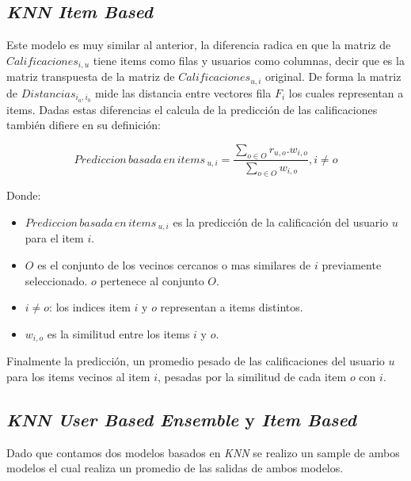 \documentclass[11pt,a4paper,twoside]{thesis}
\begin{document}
\subsection{\textit{KNN Item Based}}

Este modelo es muy similar al anterior, la diferencia radica en que la matriz de $Calificaciones_{i, u}$ tiene items como filas y usuarios como columnas, decir que es la matriz transpuesta de la matriz de $Calificaciones_{u, i}$ original. De forma la matriz de $Distancias_{i_a,i_b}$ mide las distancia entre vectores fila $F_i$ los cuales representan a items. Dadas estas diferencias el calcula de la predicción de las calificaciones también difiere en su definición:


\begin{equation*}
	Prediccion \mspace{3mu}basada \mspace{3mu}en \mspace{3mu}items\mspace{3mu}_{u, i} = \frac{\sum_{o \in O} r_{u, o}. w_{i, o} }{\sum_{o \in O} w_{i, o} }, i \neq o
\end{equation*}
\begin{description}
	\item[Donde:]
\end{description}
\begin{itemize}
	\item $Prediccion \mspace{3mu}basada \mspace{3mu}en \mspace{3mu}items\mspace{3mu}_{u, i}$ es la predicción de la calificación del usuario $u$ para el item $i$.
	\item $O$ es el conjunto de los vecinos cercanos o mas similares de $i$ previamente seleccionado. $o$ pertenece al conjunto $O$.
	\item $i \neq o$: los indices item $i$ y $o$ representan a items distintos. 
	\item $w_{i,o}$ es la similitud entre los items $i$ y $o$.
\end{itemize}

Finalmente la predicción, un promedio pesado de las calificaciones del usuario $u$ para los items vecinos al item $i$, pesadas por la similitud de cada item $o$ con $i$.

\subsection{\textit{KNN User Based Ensemble} y \textit{Item Based}}

Dado que contamos dos modelos basados en \textit{KNN} se realizo un sample de ambos modelos el cual realiza un promedio de las salidas de ambos modelos.
\end{document}
